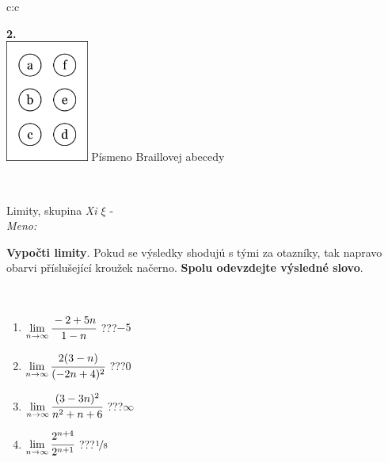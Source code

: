 \documentclass[10pt]{report}
\begin{document}
\begin{tabular}{c:c}
\begin{minipage}[c][104.5mm][t]{0.5\linewidth}
\begin{center}
\begin{minipage}{0.20\linewidth}
\begin{center}
{\Huge\bfseries 2.} \\[2mm]
\includegraphics[height=40mm]{../images/braille.png}
{\small Písmeno Braillovej abecedy}
\end{center}
\end{minipage}
\end{center}
\end{minipage}
\\ \hdashline
\begin{minipage}[c][104.5mm][t]{0.5\linewidth}
\begin{center}
\vspace{7mm}
{\huge Limity, skupina \textit{Xi $\xi$} -}\\[5mm]
\textit{Meno:}\phantom{xxxxxxxxxxxxxxxxxxxxxxxxxxxxxxxxxxxxxxxxxxxxxxxxxxxxxxxxxxxxxxxxx}\\[5mm]
\begin{minipage}{0.95\linewidth}
\begin{center}
\textbf{Vypočti limity}. Pokud se výsledky shodujú s tými za otazníky, tak napravo\\obarvi příslušející kroužek načerno. \textbf{Spolu odevzdejte výsledné slovo}.
\end{center}
\end{minipage}
\\[1mm]
\begin{minipage}{0.79\linewidth}
\begin{center}
\begin{varwidth}{\linewidth}
\begin{enumerate}
\normalsize
\item $\lim\limits_{n\to\infty}\cfrac{-2+5n}{1-n}$\quad \dotfill\; ???\;\dotfill \quad $-5$
\item $\lim\limits_{n\to\infty}\cfrac{2(3-n)}{(-2n+4)^2}$\quad \dotfill\; ???\;\dotfill \quad $0$
\item $\lim\limits_{n\to\infty}\cfrac{(3-3n)^2}{n^2+n+6}$\quad \dotfill\; ???\;\dotfill \quad $\infty$
\item $\lim\limits_{n\to\infty}\cfrac{2^{n+4}}{2^{n+1}}$\quad \dotfill\; ???\;\dotfill \quad $\nicefrac{1}{8}$

\end{enumerate}
\end{varwidth}
\end{center}
\end{minipage}
\end{center}
\end{minipage}
\end{tabular}
\end{document}
